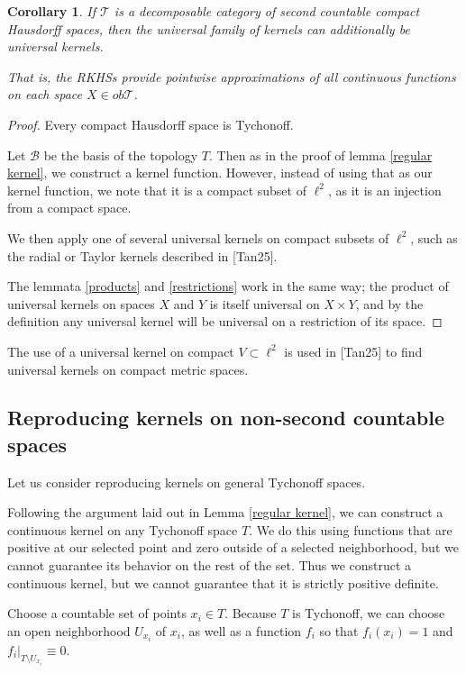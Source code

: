\documentclass[12pt]{amsart}
\newtheorem{corollary}{Corollary}[theorem]
\theoremstyle{definition}
\numberwithin{equation}{section}
\begin{document}
\begin{corollary}
    If $\mathcal T$ is a decomposable category of second countable compact Hausdorff spaces, then the universal family of kernels can additionally be universal kernels.

    That is, the RKHSs provide pointwise approximations of all continuous functions on each space $X \in ob\mathcal T$. 
\end{corollary}
\begin{proof}
    Every compact Hausdorff space is Tychonoff. 

    Let $\mathcal B$ be the basis of the topology $T$. Then as in the proof of lemma \ref{regular kernel}, we construct a kernel function. However, instead of using that as our kernel function, we note that it is a compact subset of $\ell^2$, as it is an injection from a compact space.
    
    We then apply one of several universal kernels on compact subsets of $\ell^2$, such as the radial or Taylor kernels described in [Tan25]. 
    
    The lemmata \ref{products} and \ref{restrictions} work in the same way; the product of universal kernels on spaces $X$ and $Y$ is itself universal on $X\times Y$, and by the definition any universal kernel will be universal on a restriction of its space. 
\end{proof}

The use of a universal kernel on compact $V \subset \ell^2$ is used in [Tan25] to find universal kernels on compact metric spaces. 

\subsection{Reproducing kernels on non-second countable spaces}
Let us consider reproducing kernels on general Tychonoff spaces. 

Following the argument laid out in Lemma \ref{regular kernel}, we can construct a continuous kernel on any Tychonoff space $T$. We do this using functions that are positive at our selected point and zero outside of a selected neighborhood, but we cannot guarantee its behavior on the rest of the set. Thus we construct a continuous kernel, but we cannot guarantee that it is strictly positive definite.

Choose a countable set of points $x_i \in T$. Because $T$ is Tychonoff, we can choose an open neighborhood $U_{x_i}$ of $x_i$, as well as a function $f_i$ so that $f_i(x_i) = 1$ and $f_i|_{T \setminus U_{x_i}} \equiv 0$. 
\end{document}

